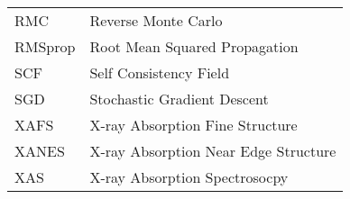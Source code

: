 \begin{table}[h]
\begin{tabular}{ll}
    RMC   &  Reverse Monte Carlo                            \\
    RMSprop & Root Mean Squared Propagation                 \\
    SCF   & Self Consistency Field                          \\
    SGD   & Stochastic Gradient Descent                     \\
    XAFS  & X-ray Absorption Fine Structure                 \\
    XANES & X-ray Absorption Near Edge Structure            \\
    XAS   & X-ray Absorption Spectrosocpy
    \end{tabular}
    \label{tab:list-of-Abbreviations}
\end{table}